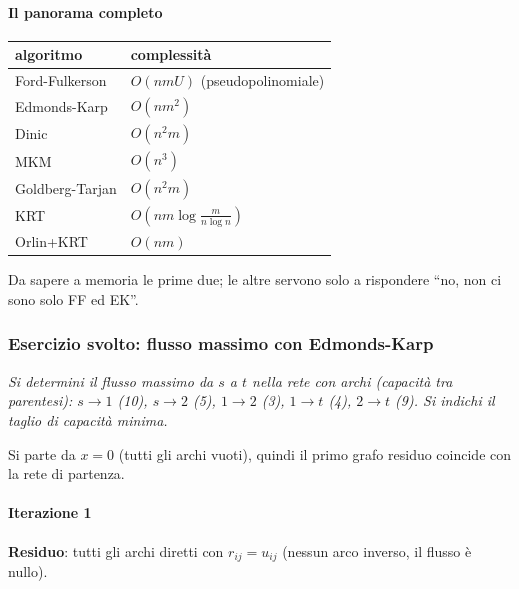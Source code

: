 \documentclass[12pt]{extarticle} %
\begin{document}
\paragraph{Il panorama completo}
\begin{center}
\begin{tabular}{ll}
\hline
\textbf{algoritmo} & \textbf{complessità} \\
\hline
Ford-Fulkerson & $O(nmU)$ \;(pseudopolinomiale) \\
Edmonds-Karp & $O(nm^2)$ \\
Dinic & $O(n^2m)$ \\
MKM & $O(n^3)$ \\
Goldberg-Tarjan & $O(n^2m)$ \\
KRT & $O\!\left(nm\log \frac{m}{n\log n}\right)$ \\
Orlin+KRT & $O(nm)$ \\
\hline
\end{tabular}
\end{center}
\noindent Da sapere a memoria le prime due; le altre servono solo a rispondere ``no, non ci sono solo FF ed EK''.

\subsubsection{Esercizio svolto: flusso massimo con Edmonds-Karp}
\textit{Si determini il flusso massimo da $s$ a $t$ nella rete con archi (capacità tra parentesi): $s\to 1$ (10), $s\to 2$ (5), $1\to 2$ (3), $1\to t$ (4), $2\to t$ (9). Si indichi il taglio di capacità minima.}
\begin{center}
\end{center}
Si parte da $x = 0$ (tutti gli archi vuoti), quindi il primo grafo residuo coincide con la rete di partenza.

\paragraph{Iterazione 1}
\textbf{Residuo}: tutti gli archi diretti con $r_{ij} = u_{ij}$ (nessun arco inverso, il flusso è nullo).
\end{document}
